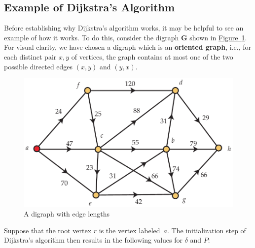 \documentclass[10pt,]{book}
\newcommand{\terminology}[1]{\textbf{#1}}
\theoremstyle{plain}
\theoremstyle{definition}
\theoremstyle{definition}
\theoremstyle{definition}
\theoremstyle{definition}
\numberwithin{equation}{section}
\newcommand{\bfG}{\mathbf{G}}
\begin{document}
\typeout{************************************************}
\typeout{************************************************}
\subsection[{Example of Dijkstra's Algorithm}]{Example of Dijkstra's Algorithm}\label{subsection-24}
\hypertarget{p-197}{}%
Before establishing why Dijkstra's algorithm works, it may be helpful to see an example of how it works. To do this, consider the digraph \(\bfG\) shown in \hyperref[fig_graphalgorithms_dijkstragraph]{Figure~\ref{fig_graphalgorithms_dijkstragraph}}. For visual clarity, we have chosen a digraph which is an \terminology{oriented graph}, i.e.\@, for each distinct pair \(x,y\) of vertices, the graph contains at most one of the two possible directed edges \((x,y)\) and \((y,x)\).%
\begin{figure}
\centering
\includegraphics[width=0.85\linewidth]{images/dijkstragraph}
\caption{A digraph with edge lengths\label{fig_graphalgorithms_dijkstragraph}}
\end{figure}
\hypertarget{p-198}{}%
Suppose that the root vertex \(r\) is the vertex labeled~\(a\). The initialization step of Dijkstra's algorithm then results in the following values for \(\delta\) and \(P\):%
\typeout{************************************************}
\typeout{************************************************}
\end{document}
